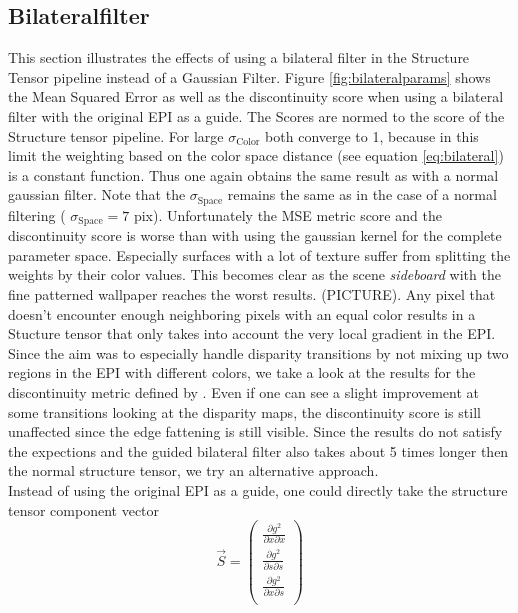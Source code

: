 \documentclass  [
  paper    = a4,
  BCOR     = 10mm,
  twoside,
  fontsize = 12pt,
  fleqn,
  toc      = bibnumbered,
  toc      = listofnumbered,
  numbers  = noendperiod,
  headings = normal,
  listof   = leveldown,
  version  = 3.03
]                                       {scrreprt}
\begin{document}
\subsection{Bilateralfilter}
 This section illustrates the effects of using a bilateral filter in the Structure Tensor pipeline instead of a Gaussian Filter. Figure \ref{fig:bilateralparams} shows the Mean Squared Error as well as the discontinuity score when using a bilateral filter with the original EPI as a guide. The Scores are normed to the score of the Structure tensor pipeline. For large $\sigma_\text{Color}$ both converge to 1, because in this limit the weighting based on the color space distance (see equation \ref{eq:bilateral}) is a constant function. Thus one again obtains the same result as with a normal gaussian filter. Note that the $\sigma_\text{Space}$ remains the same as in the case of a normal filtering ( $\sigma_\text{Space}=7$ pix). Unfortunately the MSE metric score and the discontinuity score is worse than with using the gaussian kernel for the complete parameter space. Especially surfaces with a lot of texture suffer from splitting the weights by their color values. This becomes clear as the scene \textit{sideboard} with the fine patterned wallpaper reaches the worst results. (PICTURE). Any pixel that doesn't encounter enough neighboring pixels with an equal color results in a Stucture tensor that only takes into account the very local gradient in the EPI. Since the aim was to especially handle disparity transitions by not mixing up two regions in the EPI with different colors, we take a look at the results for the discontinuity metric defined by \cite{honauer2016benchmark}. Even if one can see a slight improvement at some transitions looking at the disparity maps, the discontinuity score is still unaffected since the edge fattening is still visible. Since the results do not satisfy the expections and the guided bilateral filter also takes about 5 times longer then the normal structure tensor, we try an alternative approach.\\
 Instead of using the original EPI as a guide, one could directly take the structure tensor component vector 
 \begin{equation}\label{key}
 \vec S = \left(\begin{matrix}
 \frac{\partial g^2}{\partial x \partial x} \\
 \frac{\partial g^2}{\partial s \partial s} \\
 \frac{\partial g^2}{\partial x \partial s} \\
 \end{matrix}\right)
 \end{equation}
\end{document}
